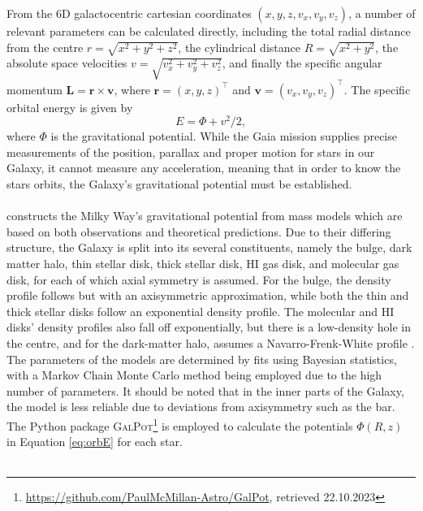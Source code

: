\documentclass[a4paper,11pt]{article}
\begin{document}
%
From the 6D galactocentric cartesian coordinates $(x,y,z,v_x,v_y,v_z)$, a number of relevant parameters can be calculated directly, including the total radial distance from the centre $r=\sqrt{x^2+y^2+z^2}$, the cylindrical distance $R=\sqrt{x^2+y^2}$, the absolute space velocities $v=\sqrt{v_x^2+v_y^2+v_z^2}$, and finally the specific angular momentum $\bm{L}=\bm{r}\times\bm{v}$, where $\bm{r}=(x,y,z)^\intercal$ and $\bm{v}=(v_x,v_y,v_z)^\intercal$. The specific orbital energy is given by
%
\begin{equation}
 E=\Phi+v^2/2,
 \label{eq:orbE}
\end{equation}
%
where $\Phi$ is the gravitational potential. While the Gaia mission supplies precise measurements of the position, parallax and proper motion for stars in our Galaxy, it cannot measure any acceleration, meaning that in order to know the stars orbits, the Galaxy’s gravitational potential must be established.\\ \\
%
\citet{mcmillan17} constructs the Milky Way’s gravitational potential from mass models which are based on both observations and theoretical predictions. Due to their differing structure, the Galaxy is split into its several constituents, namely the bulge, dark matter halo, thin stellar disk, thick stellar disk, HI gas disk, and molecular gas disk, for each of which axial symmetry is assumed. For the bulge, the density profile follows \citet{bissantz02} but with an axisymmetric approximation, while both the thin and thick stellar disks follow an exponential density profile. The molecular and HI disks’ density profiles also fall off exponentially, but there is a low-density hole in the centre, and for the dark-matter halo, \citet{mcmillan17} assumes a Navarro-Frenk-White profile \citep{nfwhalo}. The parameters of the models are determined by fits using Bayesian statistics, with a Markov Chain Monte Carlo method being employed due to the high number of parameters. It should be noted that in the inner parts of the Galaxy, the model is less reliable due to deviations from axisymmetry such as the bar. The Python package \textsc{GalPot}\footnote{\url{https://github.com/PaulMcMillan-Astro/GalPot}, retrieved 22.10.2023} \citep{mcmillan17,dehnen98} is employed to calculate the potentials $\Phi(R,z)$ in Equation \ref{eq:orbE} for each star.\\ \\
%
\end{document}

